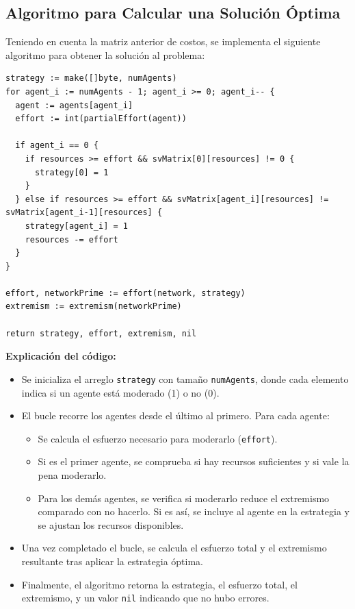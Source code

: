 \documentclass[letterpaper,10pt]{article}
\begin{document}
\subsection{Algoritmo para Calcular una Solución Óptima}
\label{subsec:algoritmo_solucion_optima}
Teniendo en cuenta la matriz anterior de costos, se implementa el siguiente algoritmo para obtener la solución al problema:
\begin{lstlisting}[caption={Reconstruct Strategy $\rightarrow$Extracción del algoritmo ModexPD}, label={lst:modexpd_extraccion2}]
strategy := make([]byte, numAgents)
for agent_i := numAgents - 1; agent_i >= 0; agent_i-- {
  agent := agents[agent_i]
  effort := int(partialEffort(agent))

  if agent_i == 0 {
    if resources >= effort && svMatrix[0][resources] != 0 {
      strategy[0] = 1
    }
  } else if resources >= effort && svMatrix[agent_i][resources] != svMatrix[agent_i-1][resources] {
    strategy[agent_i] = 1
    resources -= effort
  }
}

effort, networkPrime := effort(network, strategy)
extremism := extremism(networkPrime)

return strategy, effort, extremism, nil
\end{lstlisting}
\textbf{Explicación del código:}
\begin{itemize}
  \item Se inicializa el arreglo \texttt{strategy} con tamaño \texttt{numAgents}, donde cada elemento indica si un agente está moderado (1) o no (0).

  \item El bucle recorre los agentes desde el último al primero. Para cada agente:
  \begin{itemize}
    \item Se calcula el esfuerzo necesario para moderarlo (\texttt{effort}).
    \item Si es el primer agente, se comprueba si hay recursos suficientes y si vale la pena moderarlo.
    \item Para los demás agentes, se verifica si moderarlo reduce el extremismo comparado con no hacerlo. Si es así, se incluye al agente en la estrategia y se ajustan los recursos disponibles.
  \end{itemize}

  \item Una vez completado el bucle, se calcula el esfuerzo total y el extremismo resultante tras aplicar la estrategia óptima.

  \item Finalmente, el algoritmo retorna la estrategia, el esfuerzo total, el extremismo, y un valor \texttt{nil} indicando que no hubo errores.
\end{itemize}
\end{document}
